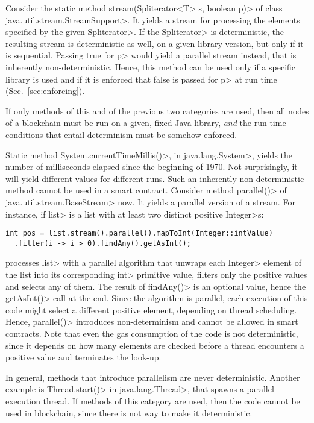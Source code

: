 Consider the static method
\<stream(Spliterator$\text{<}$T$\text{>}$ s, boolean p)>
of class \<java.util.stream.StreamSupport>. It
yields a stream for processing the elements specified by
the given \<Spliterator>. If the \<Spliterator> is deterministic,
the resulting stream is deterministic as well,
on a given library version, but only if it is sequential.
Passing true for \<p> would yield a parallel stream instead, that is
inherently non-deterministic.
Hence, this method can be used only if a specific library is used and
if it is enforced that false is passed for \<p> at run time (Sec.~\ref{sec:enforcing}).

If only methods of this and of the previous two categories are used, then
all nodes of a blockchain must be run on a given, fixed Java library, \emph{and}
the run-time conditions that entail determinism must be somehow enforced.

Static method \<System.currentTimeMillis()>, in \<java.lang.System>,
yields the number of milliseconds elapsed since the beginning of 1970.
Not surprisingly, it will yield different values for different runs.
Such an inherently non-deterministic method cannot be used in a smart contract.
Consider method \<parallel()> of \<java.util.stream.BaseStream> now.
It yields a parallel version of a stream. For instance, if \<list> is a list with
at least two distinct positive \<Integer>s:
%
\begin{verbatim}
int pos = list.stream().parallel().mapToInt(Integer::intValue)
  .filter(i -> i > 0).findAny().getAsInt();
\end{verbatim}
%
processes \<list> with a parallel algorithm
that unwraps each \<Integer> element of the list into its corresponding \<int> primitive value,
filters only the positive values and selects any of them.
The result of \<findAny()> is an optional value, hence the
\<getAsInt()> call at the end. Since the algorithm is
parallel, each execution of this code might select a different
positive element, depending on thread scheduling. Hence, \<parallel()>
introduces non-determinism and
cannot be allowed in smart contracts. Note that even the gas consumption
of the code is not deterministic, since it depends on how many elements
are checked before a thread encounters a positive value and terminates
the look-up.

In general, methods that introduce parallelism are never deterministic.
Another example is \<Thread.start()> in \<java.lang.Thread>, that spawns
a parallel execution thread.
If methods of this category are used, then the code cannot be used in blockchain,
since there is not way to make it deterministic.
